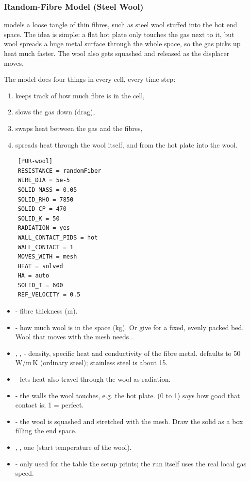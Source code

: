 \subsubsection{Random-Fibre Model (Steel Wool)}\label{sec:fiberModel}
 models a loose tangle of thin fibres, such as steel wool stuffed into the hot end space. The idea is simple: a flat hot plate only touches the gas next to it, but wool spreads a huge metal surface through the whole space, so the gas picks up heat much faster. The wool also gets squashed and released as the displacer moves.

The model does four things in every cell, every time step:
\begin{enumerate}
    \item keeps track of how much fibre is in the cell,
    \item slows the gas down (drag),
    \item swaps heat between the gas and the fibres,
    \item spreads heat through the wool itself, and from the hot plate into the wool.
\end{enumerate}

\begin{lstlisting}
    [POR-wool]
    RESISTANCE = randomFiber
    WIRE_DIA = 5e-5
    SOLID_MASS = 0.05
    SOLID_RHO = 7850
    SOLID_CP = 470
    SOLID_K = 50
    RADIATION = yes
    WALL_CONTACT_PIDS = hot
    WALL_CONTACT = 1
    MOVES_WITH = mesh
    HEAT = solved
    HA = auto
    SOLID_T = 600
    REF_VELOCITY = 0.5
\end{lstlisting}
\begin{itemize}
    \item {} - fibre thickness (m).
    \item {} - how much wool is in the space (kg). Or give  for a fixed, evenly packed bed. Wool that moves with the mesh needs .
    \item {}, ,  - density, specific heat and conductivity of the fibre metal.  defaults to 50\,W/m\,K (ordinary steel); stainless steel is about 15.
    \item {} -  lets heat also travel through the wool as radiation.
    \item {} - the walls the wool touches, e.g. the hot plate.  (0 to 1) says how good that contact is; 1 = perfect.
    \item {} - the wool is squashed and stretched with the mesh. Draw the  solid as a box filling the end space.
    \item {}, , one  (start temperature of the wool).
    \item {} - only used for the table the setup prints; the run itself uses the real local gas speed.
\end{itemize}

